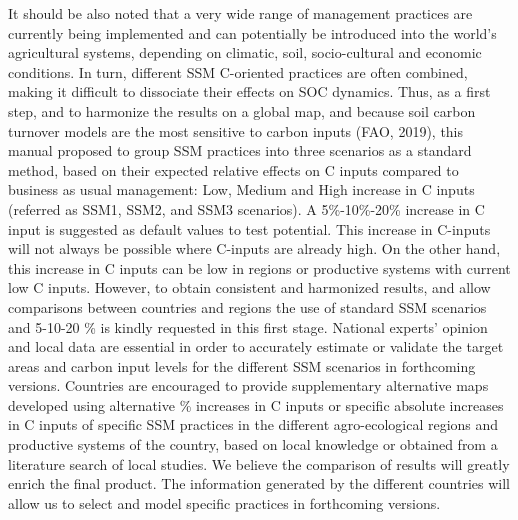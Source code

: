 \documentclass[
  10pt,
  b5paper,
]{book}
\begin{document}
It should be also noted that a very wide range of management practices are currently being implemented and can potentially be introduced into the world's agricultural systems, depending on climatic, soil, socio-cultural and economic conditions. In turn, different SSM C-oriented practices are often combined, making it difficult to dissociate their effects on SOC dynamics. Thus, as a first step, and to harmonize the results on a global map, and because soil carbon turnover models are the most sensitive to carbon inputs (FAO, 2019), this manual proposed to group SSM practices into three scenarios as a standard method, based on their expected relative effects on C inputs compared to business as usual management: Low, Medium and High increase in C inputs (referred as SSM1, SSM2, and SSM3 scenarios). A 5\%-10\%-20\% increase in C input is suggested as default values to test potential. This increase in C-inputs will not always be possible where C-inputs are already high. On the other hand, this increase in C inputs can be low in regions or productive systems with current low C inputs. However, to obtain consistent and harmonized results, and allow comparisons between countries and regions the use of standard SSM scenarios and 5-10-20 \% is kindly requested in this first stage. National experts' opinion and local data are essential in order to accurately estimate or validate the target areas and carbon input levels for the different SSM scenarios in forthcoming versions. Countries are encouraged to provide supplementary alternative maps developed using alternative \% increases in C inputs or specific absolute increases in C inputs of specific SSM practices in the different agro-ecological regions and productive systems of the country, based on local knowledge or obtained from a literature search of local studies. We believe the comparison of results will greatly enrich the final product. The information generated by the different countries will allow us to select and model specific practices in forthcoming versions.
\end{document}
